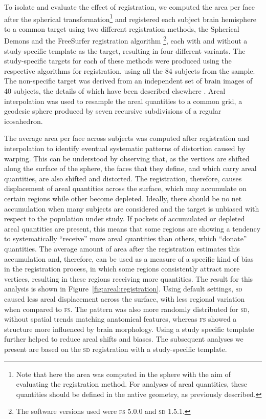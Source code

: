 To isolate and evaluate the effect of registration, we computed the area per face after the spherical transformation\footnote{Note that here the area was computed in the sphere with the aim of evaluating the registration method. For analyses of areal quantities, these quantities should be defined in the native geometry, as previously described.} and registered each subject brain hemisphere to a common target using two different registration methods, the Spherical Demons \citep{Yeo2010} and the FreeSurfer registration algorithm \citep{Fischl1999_intersubject}\footnote{The software versions used were \textsc{fs} 5.0.0 and \textsc{sd} 1.5.1.}, each with and without a study-specific template as the target, resulting in four different variants. The study-specific targets for each of these methods were produced using the respective algorithms for registration, using all the 84 subjects from the sample. The non-specific target was derived from an independent set of brain images of 40 subjects, the details of which have been described elsewhere \citep{Desikan2006}. Areal interpolation was used to resample the areal quantities to a common grid, a geodesic sphere produced by seven recursive subdivisions of a regular icosahedron.

The average area per face across subjects was computed after registration and interpolation to identify eventual systematic patterns of distortion caused by warping. This can be understood by observing that, as the vertices are shifted along the surface of the sphere, the faces that they define, and which carry areal quantities, are also shifted and distorted. The registration, therefore, causes displacement of areal quantities across the surface, which may accumulate on certain regions while other become depleted. Ideally, there should be no net accumulation when many subjects are considered and the target is unbiased with respect to the population under study. If pockets of accumulated or depleted areal quantities are present, this means that some regions are showing a tendency to systematically ``receive'' more areal quantities than others, which ``donate'' quantities. The average amount of area after the registration estimates this accumulation and, therefore, can be used as a measure of a specific kind of bias in the registration process, in which some regions consistently attract more vertices, resulting in these regions receiving more quantities. The result for this analysis is shown in Figure~\ref{fig:areal:registration}. Using default settings, \textsc{sd} caused less areal displacement across the surface, with less regional variation when compared to \textsc{fs}. The pattern was also more randomly distributed for \textsc{sd}, without spatial trends matching anatomical features, whereas \textsc{fs} showed a structure more influenced by brain morphology. Using a study specific template further helped to reduce areal shifts and biases. The subsequent analyses we present are based on the \textsc{sd} registration with a study-specific template.

